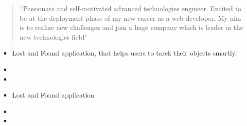 \documentclass[10pt,a4paper,ragged2e,withhyper]{altacv}
\begin{document}
\begin{paracol}{2}

\switchcolumn


\begin{quote}
``Passionate and self-motivated advanced technologies engineer. Excited to be at the deployment phase of my new career as a web developer. My aim is to realize new challenges and join a huge company which is leader in the new technologies field''
\end{quote}

            \begin{itemize}
                 \item Lost and Found application, that helps users to tarck their objects smartly.
                \item 
                \item 
            \end{itemize}
            
            \divider
            
            \begin{itemize}
                \item Lost and Found application
                \item 
                \item 
            \end{itemize}
            
            

\end{paracol}
\end{document}
